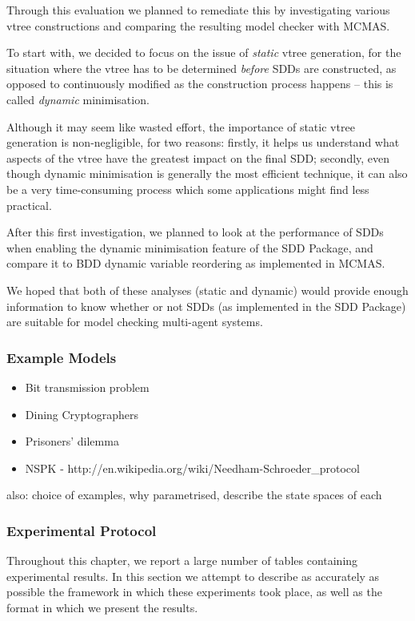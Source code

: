\documentclass[11pt]{article}
\begin{document}
Through this evaluation we planned to remediate this by investigating various vtree constructions and comparing the resulting model checker with MCMAS. 

To start with, we decided to focus on the issue of \textit{static} vtree generation, for the situation where the vtree has to be determined \textit{before} SDDs are constructed, as opposed to continuously modified as the construction process happens -- this is called \textit{dynamic} minimisation. 

Although it may seem like wasted effort, the importance of static vtree generation is non-negligible, for two reasons: firstly, it helps us understand what aspects of the vtree have the greatest impact on the final SDD; secondly, even though dynamic minimisation is generally the most efficient technique, it can also be a very time-consuming process which some applications might find less practical. 

After this first investigation, we planned to look at the performance of SDDs when enabling the dynamic minimisation feature of the SDD Package, and compare it to BDD dynamic variable reordering as implemented in MCMAS.

We hoped that both of these analyses (static and dynamic) would provide enough information to know whether or not SDDs (as implemented in the SDD Package) are suitable for model checking multi-agent systems.

	\subsubsection{Example Models}
	\label{ispl_examples}
\begin{itemize}
\item Bit transmission problem 
\item Dining Cryptographers
\item Prisoners' dilemma 
\item NSPK - 
http://en.wikipedia.org/wiki/Needham-Schroeder\_protocol
\end{itemize}

also: choice of examples, why parametrised, describe the state spaces of each

\subsubsection{Experimental Protocol} 

Throughout this chapter, we report a large number of tables containing experimental results. In this section we attempt to describe as accurately as possible the framework in which these experiments took place, as well as the format in which we present the results. 
\end{document}
